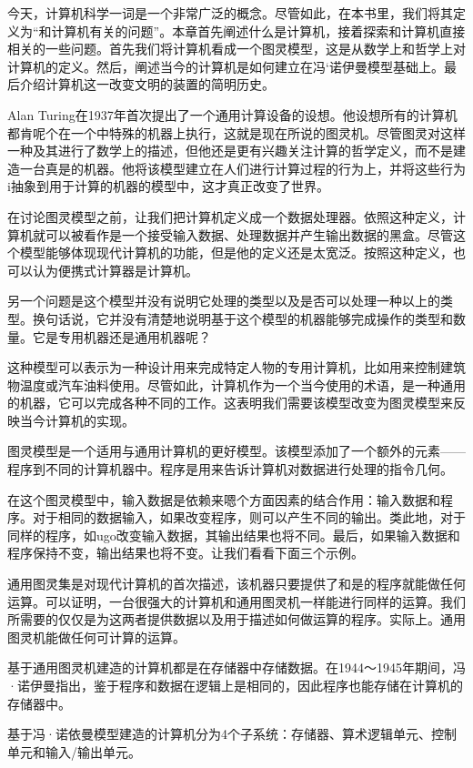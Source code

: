 今天，计算机科学一词是一个非常广泛的概念。尽管如此，在本书里，我们将其定义为“和计算机有关的问题”。本章首先阐述什么是计算机，接着探索和计算机直接相关的一些问题。首先我们将计算机看成一个图灵模型，这是从数学上和哲学上对计算机的定义。然后，阐述当今的计算机是如何建立在冯`诺伊曼模型基础上。最后介绍计算机这一改变文明的装置的简明历史。


Alan Turing在1937年首次提出了一个通用计算设备的设想。他设想所有的计算机都肯呢个在一个中特殊的机器上执行，这就是现在所说的图灵机。尽管图灵对这样一种及其进行了数学上的描述，但他还是更有兴趣关注计算的哲学定义，而不是建造一台真是的机器。他将该模型建立在人们进行计算过程的行为上，并将这些行为i抽象到用于计算的机器的模型中，这才真正改变了世界。


在讨论图灵模型之前，让我们把计算机定义成一个数据处理器。依照这种定义，计算机就可以被看作是一个接受输入数据、处理数据并产生输出数据的黑盒。尽管这个模型能够体现现代计算机的功能，但是他的定义还是太宽泛。按照这种定义，也可以认为便携式计算器是计算机。

另一个问题是这个模型并没有说明它处理的类型以及是否可以处理一种以上的类型。换句话说，它并没有清楚地说明基于这个模型的机器能够完成操作的类型和数量。它是专用机器还是通用机器呢？


这种模型可以表示为一种设计用来完成特定人物的专用计算机，比如用来控制建筑物温度或汽车油料使用。尽管如此，计算机作为一个当今使用的术语，是一种通用的机器，它可以完成各种不同的工作。这表明我们需要该模型改变为图灵模型来反映当今计算机的实现。

图灵模型是一个适用与通用计算机的更好模型。该模型添加了一个额外的元素——程序到不同的计算机器中。程序是用来告诉计算机对数据进行处理的指令几何。

在这个图灵模型中，输入数据是依赖来嗯个方面因素的结合作用：输入数据和程序。对于相同的数据输入，如果改变程序，则可以产生不同的输出。类此地，对于同样的程序，如ugo改变输入数据，其输出结果也将不同。最后，如果输入数据和程序保持不变，输出结果也将不变。让我们看看下面三个示例。

通用图灵集是对现代计算机的首次描述，该机器只要提供了和是的程序就能做任何运算。可以证明，一台很强大的计算机和通用图灵机一样能进行同样的运算。我们所需要的仅仅是为这两者提供数据以及用于描述如何做运算的程序。实际上。通用图灵机能做任何可计算的运算。

基于通用图灵机建造的计算机都是在存储器中存储数据。在1944～1945年期间，冯·诺伊曼指出，鉴于程序和数据在逻辑上是相同的，因此程序也能存储在计算机的存储器中。

基于冯·诺依曼模型建造的计算机分为4个子系统：存储器、算术逻辑单元、控制单元和输入/输出单元。

